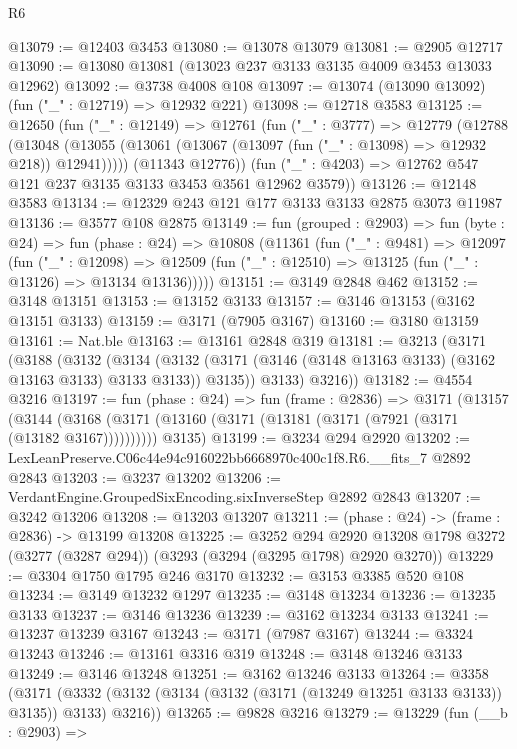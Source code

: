 \begin{lexlean}{R6}
\begin{coremodule}
@13079 := @12403 @3453
@13080 := @13078 @13079
@13081 := @2905 @12717
@13090 := @13080 @13081 (@13023 @237 @3133 @3135 @4009 @3453 @13033 @12962)
@13092 := @3738 @4008 @108
@13097 := @13074 (@13090 @13092) (fun ("_" : @12719) => @12932 @221)
@13098 := @12718 @3583
@13125 := @12650
    (fun ("_" : @12149) =>
    @12761
      (fun ("_" : @3777) =>
      @12779
        (@12788
          (@13048 (@13055 (@13061 (@13067 (@13097 (fun ("_" : @13098) => @12932 @218)) @12941)))))
        (@11343 @12776))
      (fun ("_" : @4203) => @12762 @547 @121 @237 @3135 @3133 @3453 @3561 @12962 @3579))
@13126 := @12148 @3583
@13134 := @12329 @243 @121 @177 @3133 @3133 @2875 @3073 @11987
@13136 := @3577 @108 @2875
@13149 := fun (grouped : @2903) =>
  fun (byte : @24) =>
  fun (phase : @24) =>
  @10808
    (@11361
      (fun ("_" : @9481) =>
      @12097
        (fun ("_" : @12098) =>
        @12509 (fun ("_" : @12510) => @13125 (fun ("_" : @13126) => @13134 @13136)))))
@13151 := @3149 @2848 @462
@13152 := @3148 @13151
@13153 := @13152 @3133
@13157 := @3146 @13153 (@3162 @13151 @3133)
@13159 := @3171 (@7905 @3167)
@13160 := @3180 @13159
@13161 := Nat.ble
@13163 := @13161 @2848 @319
@13181 := @3213
    (@3171
      (@3188
        (@3132
          (@3134
            (@3132 (@3171 (@3146 (@3148 @13163 @3133) (@3162 @13163 @3133) @3133 @3133)) @3135))
          @3133)
        @3216))
@13182 := @4554 @3216
@13197 := fun (phase : @24) =>
  fun (frame : @2836) =>
  @3171
    (@13157
      (@3144 (@3168 (@3171 (@13160 (@3171 (@13181 (@3171 (@7921 (@3171 (@13182 @3167))))))))))
      @3135)
@13199 := @3234 @294 @2920
@13202 := LexLeanPreserve.C06c44e94c916022bb6668970c400c1f8.R6.__fits_7 @2892 @2843
@13203 := @3237 @13202
@13206 := VerdantEngine.GroupedSixEncoding.sixInverseStep @2892 @2843
@13207 := @3242 @13206
@13208 := @13203 @13207
@13211 := (phase : @24) -> (frame : @2836) -> @13199 @13208
@13225 := @3252
    @294
    @2920
    @13208
    @1798
    @3272
    (@3277 (@3287 @294))
    (@3293 (@3294 (@3295 @1798) @2920 @3270))
@13229 := @3304 @1750 @1795 @246 @3170
@13232 := @3153 @3385 @520 @108
@13234 := @3149 @13232 @1297
@13235 := @3148 @13234
@13236 := @13235 @3133
@13237 := @3146 @13236
@13239 := @3162 @13234 @3133
@13241 := @13237 @13239 @3167
@13243 := @3171 (@7987 @3167)
@13244 := @3324 @13243
@13246 := @13161 @3316 @319
@13248 := @3148 @13246 @3133
@13249 := @3146 @13248
@13251 := @3162 @13246 @3133
@13264 := @3358
    (@3171 (@3332 (@3132 (@3134 (@3132 (@3171 (@13249 @13251 @3133 @3133)) @3135)) @3133) @3216))
@13265 := @9828 @3216
@13279 := @13229
    (fun (__b : @2903) =>

\end{coremodule}
\end{lexlean}
